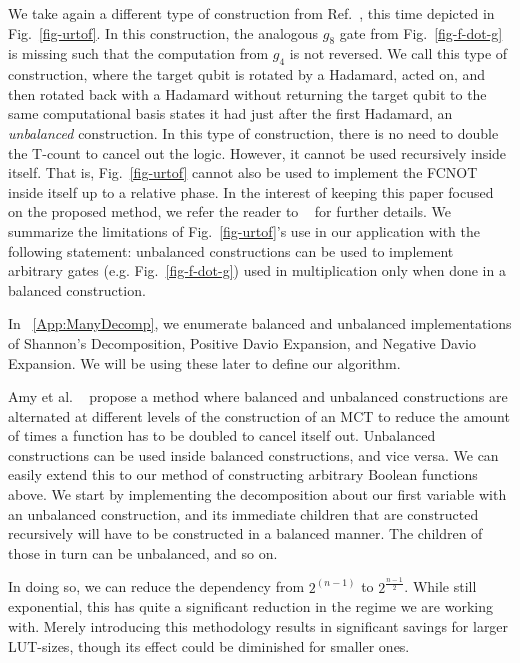 We take again a different type of construction from Ref.~\cite{bib-amy-phase-state}, this time
depicted in Fig.~\ref{fig-urtof}. In this construction, the analogous $g_{8}$ gate from Fig.~\ref{fig-f-dot-g} is missing
such that the computation from $g_4$ is not reversed. We call this type of construction, where the target qubit is rotated by a Hadamard, acted on, and then rotated
back with a Hadamard without returning the target qubit to the same computational basis states it had just after
the first Hadamard, an \emph{unbalanced} construction. In this type of construction, there is
no need to double the T-count to cancel out the logic. However, it cannot be used
recursively inside itself. That is, Fig.~\ref{fig-urtof} cannot also be used to implement the FCNOT
inside itself up to a relative phase. In the interest of keeping this paper focused on the proposed
method, we refer the reader to ~\cite{bib-amy-phase-state} for further details. We summarize the
limitations of Fig.~\ref{fig-urtof}'s use in our application with the following statement: unbalanced constructions
can be used to implement arbitrary gates (e.g. Fig.~\ref{fig-f-dot-g}) used in multiplication
only when done in a balanced construction.

In ~\ref{App:ManyDecomp}, we enumerate balanced and unbalanced implementations
of Shannon's Decomposition, Positive Davio Expansion, and Negative Davio Expansion. We will be using these
later to define our algorithm.


Amy et al. ~\cite{bib-amy-phase-state} propose a method where balanced and unbalanced constructions are alternated at different levels of the
construction of an MCT to reduce the amount of times a function has to be doubled to cancel itself out. 
Unbalanced constructions can be used inside balanced constructions,
and vice versa. We can easily extend this to our method of constructing arbitrary Boolean functions above. We start by implementing the decomposition
about our first variable with an unbalanced construction, and its immediate children that are constructed recursively will have to be constructed
in a balanced manner. The children of those in turn can be unbalanced, and so on. 

In doing so, we can reduce the dependency from $2^(n-1)$ to $2^{\frac{n-1}{2}}$. While still exponential, this has quite
a significant reduction in the regime we are working with. Merely introducing this methodology results in significant savings for larger LUT-sizes, though
its effect could be diminished for smaller ones.

